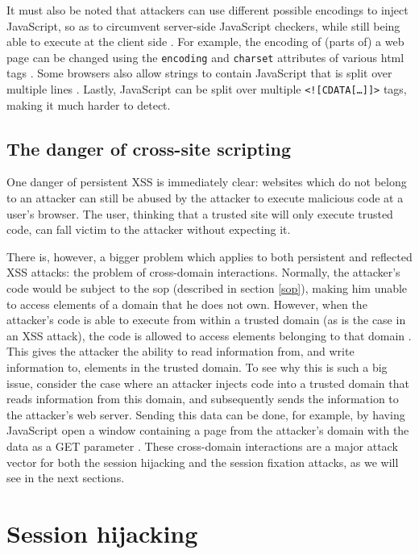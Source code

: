 It must also be noted that attackers can use different possible encodings to inject JavaScript, so as to circumvent server-side JavaScript checkers, while still being able to execute at the client side \cite{Jim2007}. For example, the encoding of (parts of) a web page can be changed using the \texttt{encoding} and \texttt{charset} attributes of various \gls{html} tags \cite{Ishida2010}. Some browsers also allow strings to contain JavaScript that is split over multiple lines \cite{Jim2007}. Lastly, JavaScript can be split over multiple  \texttt{<![CDATA[\dots]]>} tags, making it much harder to detect.

\subsection{The danger of cross-site scripting}\label{xss-problem}

One danger of persistent XSS is immediately clear: websites which do not belong to an attacker can still be abused by the attacker to execute malicious code at a user's browser. The user, thinking that a trusted site will only execute trusted code, can fall victim to the attacker without expecting it.

There is, however, a bigger problem which applies to both persistent and reflected XSS attacks: the problem of cross-domain interactions. Normally, the attacker's code would be subject to the \gls{sop} (described in section \ref{sop}), making him unable to access elements of a domain that he does not own. However, when the attacker's code is able to execute from within a trusted domain (as is the case in an XSS attack), the code is allowed to access elements belonging to that domain \cite{Klein2002}. This gives the attacker the ability to read information from, and write information to, elements in the trusted domain. To see why this is such a big issue, consider the case where an attacker injects code into a trusted domain that reads information from this domain, and subsequently sends the information to the attacker's web server. Sending this data can be done, for example, by having JavaScript open a window containing a page from the attacker's domain with the data as a GET parameter \cite{Klein2002}. These cross-domain interactions are a major \gls{attack vector} for both the session hijacking and the session fixation attacks, as we will see in the next sections.

\section{Session hijacking}\label{hijacking}

